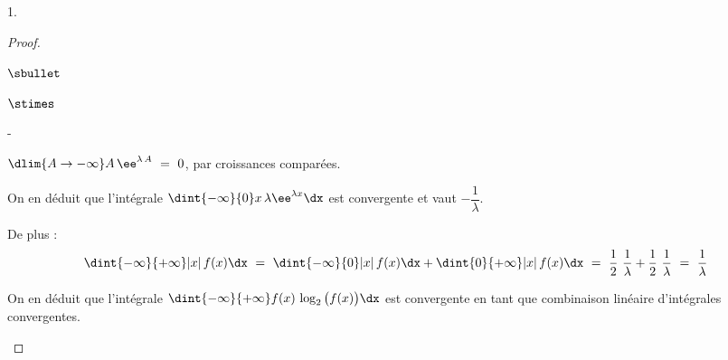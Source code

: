 \documentclass[11pt]{article}%
\begin{document}
\begin{noliste}{1.}
\begin{proof}
\begin{noliste}{$\sbullet$}
\begin{noliste}{$\stimes$}
\begin{noliste}{-}
        \item $\dlim{A \to - \infty} A \, \ee^{\lambda \, A} \ = \ 0$,
          par croissances comparées.
        \end{noliste}
        On en déduit que l'intégrale $\dint{-\infty}{0} x \, \lambda
        \ee^{\lambda x} \dx$ est convergente et vaut $-
        \dfrac{1}{\lambda}$.
      \end{noliste}
      De plus :
      \[
        \dint{-\infty}{+\infty} \vert x \vert \, f(x) \dx \ = \
        \dint{-\infty}{0} \vert x \vert \, f(x) \dx +
        \dint{0}{+\infty} \vert x \vert \, f(x) \dx
        \ = \ \dfrac{1}{2} \ \dfrac{1}{\lambda} + \dfrac{1}{2} \
        \dfrac{1}{\lambda} \ = \ \dfrac{1}{\lambda}
      \]
      
    \item On en déduit que l'intégrale $\dint{-\infty}{+\infty} f(x)
      \, \log_2 \big( f(x) \big) \dx$ est convergente en tant que
      combinaison linéaire d'intégrales convergentes.
      

\end{noliste}
\end{proof}
\end{noliste}
\end{document}
